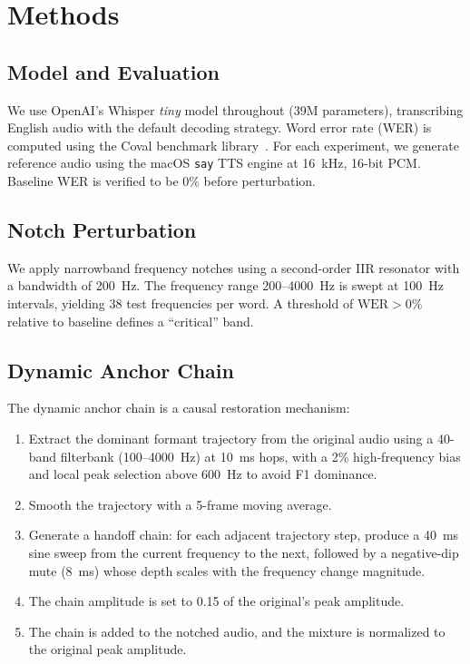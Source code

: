 \documentclass[11pt,a4paper]{article}
\begin{document}
\section{Methods}

\subsection{Model and Evaluation}
We use OpenAI's Whisper \emph{tiny} model throughout (39M parameters),
transcribing English audio with the default decoding strategy. Word error rate
(WER) is computed using the Coval benchmark library~\cite{coval}. For each
experiment, we generate reference audio using the macOS \texttt{say} TTS engine
at 16~kHz, 16-bit PCM. Baseline WER is verified to be 0\% before perturbation.

\subsection{Notch Perturbation}
We apply narrowband frequency notches using a second-order IIR resonator with a
bandwidth of 200~Hz. The frequency range 200--4000~Hz is swept at 100~Hz
intervals, yielding 38 test frequencies per word. A threshold of
$\text{WER}>0\%$ relative to baseline defines a ``critical'' band.

\subsection{Dynamic Anchor Chain}
The dynamic anchor chain is a causal restoration mechanism:

\begin{enumerate}[leftmargin=*,itemsep=2pt]
    \item Extract the dominant formant trajectory from the original audio using
        a 40-band filterbank (100--4000~Hz) at 10~ms hops, with a 2\% 
        high-frequency bias and local peak selection above 600~Hz to avoid
        F1 dominance.
    \item Smooth the trajectory with a 5-frame moving average.
    \item Generate a handoff chain: for each adjacent trajectory step, produce a
        40~ms sine sweep from the current frequency to the next, followed by a
        negative-dip mute (8~ms) whose depth scales with the frequency change
        magnitude.
    \item The chain amplitude is set to 0.15 of the original's peak amplitude.
    \item The chain is added to the notched audio, and the mixture is normalized
        to the original peak amplitude.
\end{enumerate}
\end{document}
